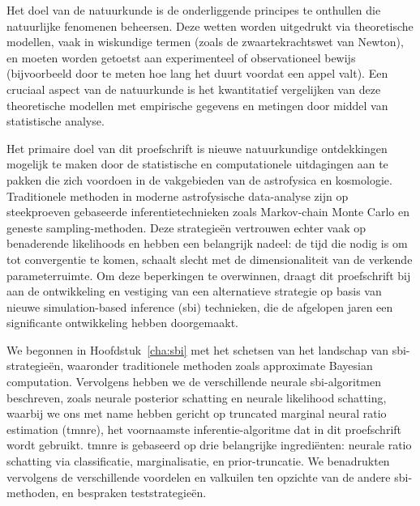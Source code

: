 Het doel van de natuurkunde is de onderliggende principes te onthullen die natuurlijke fenomenen beheersen. Deze wetten worden uitgedrukt via theoretische modellen, vaak in wiskundige termen (zoals de zwaartekrachtswet van Newton), en moeten worden getoetst aan experimenteel of observationeel bewijs (bijvoorbeeld door te meten hoe lang het duurt voordat een appel valt). Een cruciaal aspect van de natuurkunde is het kwantitatief vergelijken van deze theoretische modellen met empirische gegevens en metingen door middel van statistische analyse. 

Het primaire doel van dit proefschrift is nieuwe natuurkundige ontdekkingen mogelijk te maken door de statistische en computationele uitdagingen aan te pakken die zich voordoen in de vakgebieden van de astrofysica en kosmologie. Traditionele methoden in moderne astrofysische data-analyse zijn op steekproeven gebaseerde inferentietechnieken zoals Markov-chain Monte Carlo en geneste sampling-methoden. Deze strategieën vertrouwen echter vaak op benaderende likelihoods en hebben een belangrijk nadeel: de tijd die nodig is om tot convergentie te komen, schaalt slecht met de dimensionaliteit van de verkende parameterruimte. Om deze beperkingen te overwinnen, draagt dit proefschrift bij aan de ontwikkeling en vestiging van een alternatieve strategie op basis van nieuwe simulation-based inference (\gls*{sbi}) technieken, die de afgelopen jaren een significante ontwikkeling hebben doorgemaakt.

We begonnen in Hoofdstuk~\ref{cha:sbi} met het schetsen van het landschap van \gls*{sbi}-strategieën, waaronder traditionele methoden zoals approximate Bayesian computation. Vervolgens hebben we de verschillende neurale \gls*{sbi}-algoritmen beschreven, zoals neurale posterior schatting en neurale likelihood schatting, waarbij we ons met name hebben gericht op truncated marginal neural ratio estimation (\gls*{tmnre}), het voornaamste inferentie-algoritme dat in dit proefschrift wordt gebruikt. \Gls*{tmnre} is gebaseerd op drie belangrijke ingrediënten: neurale ratio schatting via classificatie, marginalisatie, en prior-truncatie. We benadrukten vervolgens de verschillende voordelen en valkuilen ten opzichte van de andere \gls*{sbi}-methoden, en bespraken teststrategieën. 

